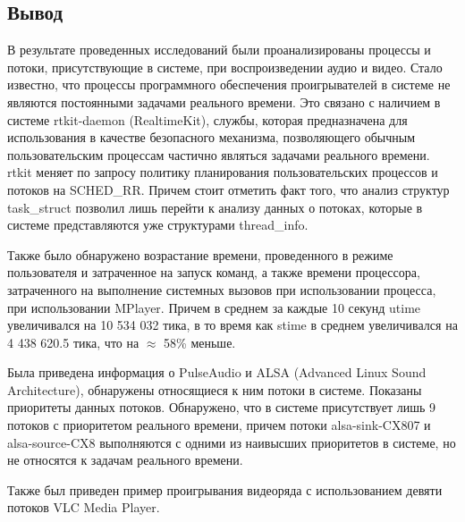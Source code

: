 \subsection*{Вывод}
В результате проведенных исследований были проанализированы процессы и потоки, присутствующие в системе, при воспроизведении аудио и видео. Стало известно, что процессы программного обеспечения проигрывателей в системе не являются постоянными задачами реального времени. Это связано с наличием в системе rtkit-daemon (RealtimeKit), службы, которая предназначена для использования в качестве безопасного механизма, позволяющего обычным пользовательским процессам частично являться задачами реального времени. rtkit меняет по запросу политику планирования пользовательских процессов и потоков на SCHED\_RR. Причем стоит отметить факт того, что анализ структур task\_struct позволил лишь перейти к анализу данных о потоках, которые в системе представляются уже структурами thread\_info.

Также было обнаружено возрастание времени, проведенного в режиме пользователя и затраченное на запуск команд, а также времени процессора, затраченного на выполнение системных вызовов при использовании процесса, при использовании MPlayer. Причем в среднем за каждые 10 секунд utime увеличивался на 10 534 032 тика, в то время как stime в среднем увеличивался на 4 438 620.5 тика, что на $\approx$ 58\% меньше.

Была приведена информация о PulseAudio и ALSA (Advanced Linux Sound Architecture), обнаружены относящиеся к ним потоки в системе. Показаны приоритеты данных потоков. Обнаружено, что в системе присутствует лишь 9 потоков с приоритетом реального времени, причем потоки alsa-sink-CX807 и alsa-source-CX8 выполняются с одними из наивысших приоритетов в системе, но не относятся к задачам реального времени.

Также был приведен пример проигрывания видеоряда с использованием девяти потоков VLC Media Player.
